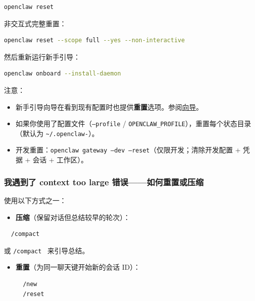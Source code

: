 \begin{lstlisting}[language=bash]
openclaw reset
\end{lstlisting}


非交互式完整重置：

\begin{lstlisting}[language=bash]
openclaw reset --scope full --yes --non-interactive
\end{lstlisting}


然后重新运行新手引导：

\begin{lstlisting}[language=bash]
openclaw onboard --install-daemon
\end{lstlisting}


注意：

\begin{itemize}
  \item 新手引导向导在看到现有配置时也提供\textbf{重置}选项。参阅\href{/start/wizard}{向导}。
  \item 如果你使用了配置文件（\texttt{--profile} / \texttt{OPENCLAW\_PROFILE}），重置每个状态目录（默认为 \texttt{\textasciitilde{}/.openclaw-}）。
  \item 开发重置：\texttt{openclaw gateway --dev --reset}（仅限开发；清除开发配置 + 凭据 + 会话 + 工作区）。
\end{itemize}


\subsubsection{我遇到了 context too large 错误——如何重置或压缩}


使用以下方式之一：

\begin{itemize}
  \item \textbf{压缩}（保留对话但总结较早的轮次）：
\end{itemize}


\begin{lstlisting}
  /compact
\end{lstlisting}


或 \texttt{/compact } 来引导总结。

\begin{itemize}
  \item \textbf{重置}（为同一聊天键开始新的会话 ID）：
\begin{lstlisting}
  /new
  /reset
\end{lstlisting}

\end{itemize}


